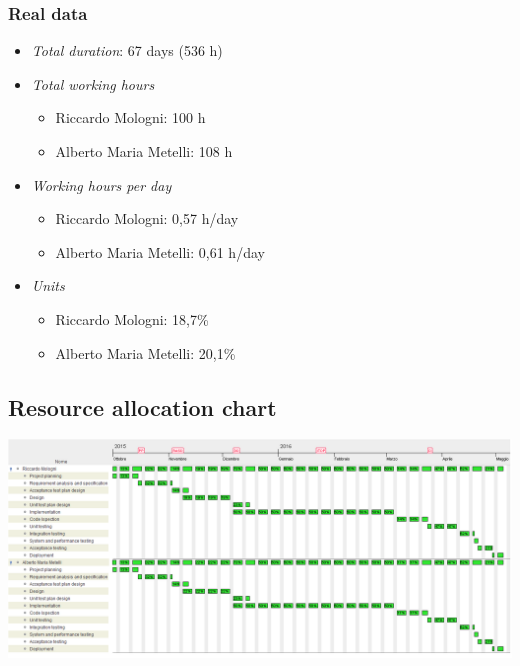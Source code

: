 \subsubsection{Real data}
\begin{itemize}
\item \emph{Total duration}: 67 days (536 h)
\item \emph{Total working hours}

\begin{itemize}
\item Riccardo Mologni: 100 h
\item Alberto Maria Metelli: 108 h
\end{itemize}
\item \emph{Working hours per day}

\begin{itemize}
\item Riccardo Mologni: 0,57 h/day
\item Alberto Maria Metelli: 0,61 h/day
\end{itemize}
\item \emph{Units}

\begin{itemize}
\item Riccardo Mologni: 18,7\%
\item Alberto Maria Metelli: 20,1\%
\end{itemize}
\end{itemize}
\begin{landscape}



\subsection{Resource allocation chart}

\medskip{}


\includegraphics[scale=0.7]{resources/resources}

\restoregeometry

\end{landscape}
